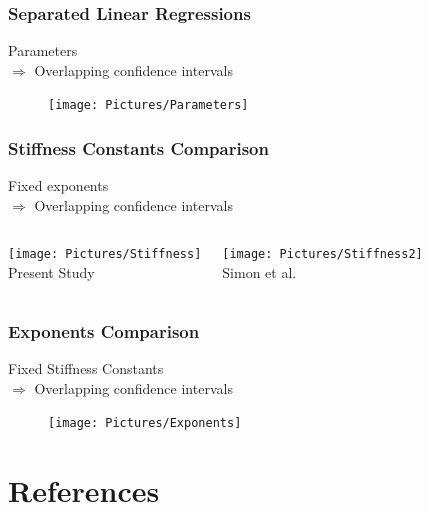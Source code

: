 \documentclass[xcolor=table,11pt]{beamer}
\begin{document}
	\begin{frame}
		\frametitle{Separated Linear Regressions}
		Parameters\\
		$\Rightarrow$ Overlapping confidence intervals\\\vfill
		\begin{figure}
			\centering
			\texttt{[image: Pictures/Parameters]}
		\end{figure}
	\end{frame}

	\begin{frame}
		\frametitle{Stiffness Constants Comparison}
		Fixed exponents\\
		$\Rightarrow$ Overlapping confidence intervals\\\vfill
		\begin{columns}
			\column[t]{0.5\linewidth}
			\centering
			\texttt{[image: Pictures/Stiffness]}\\
			Present Study

			\column[t]{0.5\linewidth}
			\centering
			\texttt{[image: Pictures/Stiffness2]}\\
			Simon et al. \cite{p2}
		\end{columns}
	\end{frame}
		
	\begin{frame}
		\frametitle{Exponents Comparison}
		Fixed Stiffness Constants\\
		$\Rightarrow$ Overlapping confidence intervals\\\vfill
		\begin{figure}
			\centering
			\texttt{[image: Pictures/Exponents]}
		\end{figure}
	\end{frame}


	\section{References}
\end{document}
